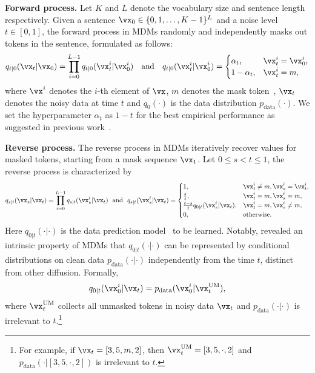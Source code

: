\documentclass{article} %
\begin{document}
\textbf{Forward process.} Let $K$ and $L$ denote the vocabulary size and sentence length respectively. Given a sentence $\vx_0 \in \{0, 1, \dots, K-1 \}^L$ and a noise level $t \in [0, 1]$, the forward process in MDMs randomly and independently masks out tokens in the sentence, formulated as follows:
\begin{align}
    q_{t|0}(\vx_t|\vx_0) = \prod_{i=0}^{L-1} q_{t|0}(\vx_t^i|\vx_0^i) \quad \text{and} \quad 
    q_{t|0}(\vx_t^i|\vx_0^i) = \begin{cases}
                        \alpha_t, & \vx_t^i = \vx_0^i, \\
                        1 - \alpha_t, & \vx_t^i = m,
                        \end{cases}
\end{align}
where $\vx^i$ denotes the $i$-th element of $\vx$, $m$ denotes the mask token~\citep{devlin2018bert}, $\vx_t$ denotes the noisy data at time $t$ and $q_0(\cdot)$ is the data distribution $p_{\textrm{data}}(\cdot)$. We set the hyperparameter $\alpha_t$ as $1 - t$ for the best empirical performance as suggested in previous work~\citep{lou2023discrete, sahoo2024simple, shi2024simplified}.

\textbf{Reverse process.} The reverse process in MDMs 
iteratively recover values for masked tokens, starting from a mask sequence $\vx_1$. Let $0\le s < t \le 1$, the reverse process is characterized by
\begin{align}
\label{equ:reverse_process}
    q_{s|t}(\vx_s|\vx_t) = \prod_{i=0}^{L-1} q_{s|t}(\vx_s^i|\vx_t)~~ \text{and} ~~
    q_{s|t}(\vx_s^i|\vx_t) = 
        \begin{cases}
            1, & \vx_t^i \neq m, \vx_s^i = \vx_t^i,\\
            \frac{s}{t}, & \vx_t^i = m, \vx_s^i = m, \\
            \frac{t - s}{t} q_{0|t}(\vx_s^i|\vx_t), & \vx_t^i = m, \vx_s^i \neq m, \\
            0, & \textrm{otherwise}.
        \end{cases}
\end{align}
Here $q_{0|t}(\cdot|\cdot)$ is the data prediction model~\citep{ho2020denoising} to be learned. Notably, \cite{ou2024your} revealed an intrinsic property of MDMs that  $q_{0|t}(\cdot|\cdot)$ can be represented by conditional distributions on clean data $p_{\text{data}}(\cdot|\cdot)$ independently from the time $t$, distinct from other diffusion. Formally, 
\begin{align}
\label{equ:condition_distribution}
q_{0|t}(\vx_0^i|\vx_t) =
p_{\text{data}}(\vx_0^i|\vx_t^{\text{UM}}),
\end{align}
where $\vx_t^{\text{UM}}$ collects all unmasked tokens in noisy data $\vx_t$ and $p_{\text{data}}(\cdot|\cdot)$ is irrelevant to $t$.\footnote{For example, if $\vx_t =[3, 5, m,2]$, then $\vx_t^{\text{UM}} = [3, 5, \cdot, 2]$ and $p_{\text{data}}(\cdot|[3, 5, \cdot, 2])$ is irrelevant to $t$.}
\end{document}
